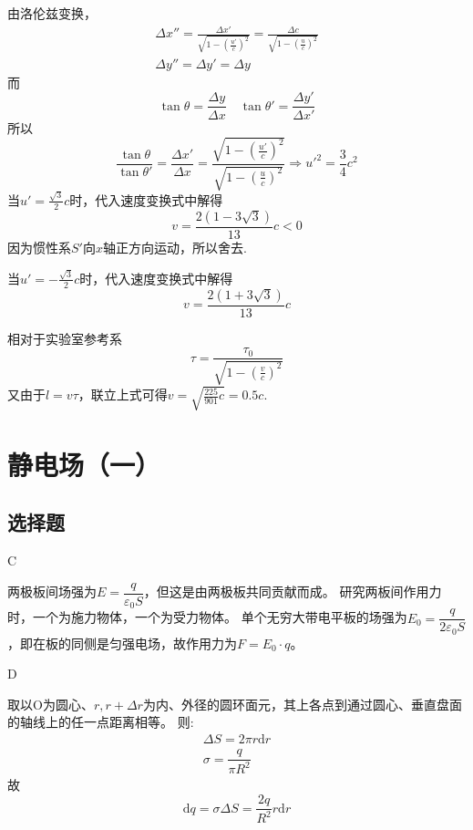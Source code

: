 \documentclass[b5paper,opensource,sourcefont,parskip]{qyxf-book}
\newcommand{\di}[1]{\mathrm{d}#1}
\begin{document}
由洛伦兹变换，
\begin{align*}
\Delta x''=\frac{\Delta x'}{\sqrt{1-(\frac{u'}{c})^2}}=\frac{\Delta c}{\sqrt{1-(\frac{u}{c})^2}}\\\Delta y''=\Delta y'=\Delta y
\end{align*}
而
\begin{equation*}
\tan{\theta}=\frac{\Delta y}{\Delta x}\quad \tan{\theta'}=\frac{\Delta y'}{\Delta x'}
\end{equation*}
所以
\begin{equation*}
\frac{\tan{\theta}}{\tan{\theta'}}=\frac{\Delta x'}{\Delta x}=\frac{\sqrt{1-(\frac{u'}{c})^2}}{\sqrt{1-(\frac{u}{c})^2}}\Rightarrow u'^2=\frac{3}{4}c^2
\end{equation*}
当$u'=\frac{\sqrt{3}}{2}c$时，代入速度变换式中解得
\begin{equation*}
v=\frac{2(1-3\sqrt{3})}{13}c<0
\end{equation*}
因为惯性系$S'$向$x$轴正方向运动，所以舍去.

当$u'=-\frac{\sqrt{3}}{2}c$时，代入速度变换式中解得
\begin{equation*}
v=\frac{2(1+3\sqrt{3})}{13}c
\end{equation*}


\solve
相对于实验室参考系
\begin{equation*}
\tau=\frac{\tau_0}{\sqrt{1-(\frac{v}{c})^2}}
\end{equation*}
又由于$l=v\tau$，联立上式可得$v=\sqrt{\frac{225}{901}c}=0.5c$.

\chapter{静电场（一）}
\section{选择题}

C

\solve
两极板间场强为$E=\dfrac{q}{\varepsilon_0S}$，但这是由两极板共同贡献而成。
研究两板间作用力时，一个为施力物体，一个为受力物体。
单个无穷大带电平板的场强为$E_0=\dfrac{q}{2\varepsilon_0S}$，即在板的同侧是匀强电场，故作用力为$F=E_0\cdot q$。

D

\solve
取以O为圆心、$r,r+\Delta r$为内、外径的圆环面元，其上各点到通过圆心、垂直盘面的轴线上的任一点距离相等。
则:
\begin{gather*}
\Delta S=2\pi r\di{r}\\
\sigma=\dfrac{q}{\pi R^2}
\end{gather*}
故
\begin{equation*}
\di{q}=\sigma \Delta S=\dfrac{2q}{R^2}r\di{r}
\end{equation*}
\end{document}
